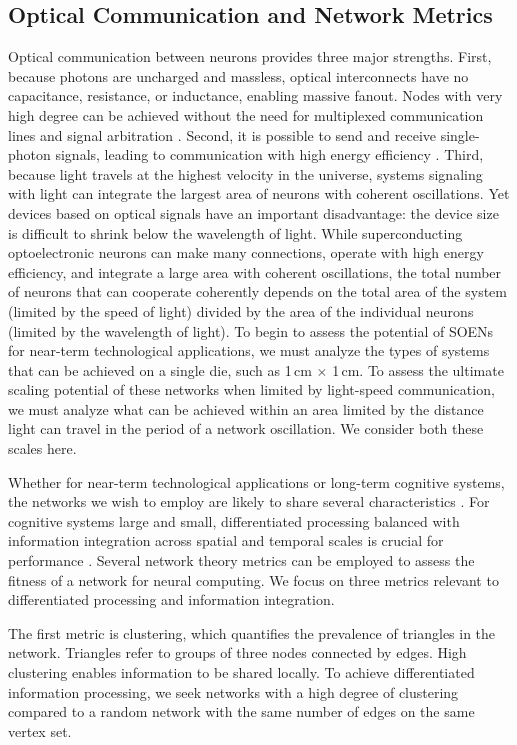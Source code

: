 \documentclass[aip,amsmath,amssymb,reprint,nofootinbib]{revtex4-1}
\begin{document}
\subsection{\label{sec:opticalCommunicationAndGraphMetrics}Optical Communication and Network Metrics}
Optical communication between neurons provides three major strengths. First, because photons are uncharged and massless, optical interconnects have no capacitance, resistance, or inductance, enabling massive fanout. Nodes with very high degree can be achieved without the need for multiplexed communication lines and signal arbitration \cite{lide2015}. Second, it is possible to send and receive single-photon signals, leading to communication with high energy efficiency \cite{mave2013}. Third, because light travels at the highest velocity in the universe, systems signaling with light can integrate the largest area of neurons with coherent oscillations. Yet devices based on optical signals have an important disadvantage: the device size is difficult to shrink below the wavelength of light. While superconducting optoelectronic neurons can make many connections, operate with high energy efficiency, and integrate a large area with coherent oscillations, the total number of neurons that can cooperate coherently depends on the total area of the system (limited by the speed of light) divided by the area of the individual neurons (limited by the wavelength of light). To begin to assess the potential of SOENs for near-term technological applications, we must analyze the types of systems that can be achieved on a single die, such as 1\,cm $\times$ 1\,cm. To assess the ultimate scaling potential of these networks when limited by light-speed communication, we must analyze what can be achieved within an area limited by the distance light can travel in the period of a network oscillation. We consider both these scales here.

Whether for near-term technological applications or long-term cognitive systems, the networks we wish to employ are likely to share several characteristics \cite{busp2009}. For cognitive systems large and small, differentiated processing balanced with information integration across spatial and temporal scales is crucial for performance \cite{tosp2003,to2004,to2008,bu2006,sp2010,base2011,haah2017}. Several network theory metrics can be employed to assess the fitness of a network for neural computing. We focus on three metrics relevant to differentiated processing and information integration. 

The first metric is clustering, which quantifies the prevalence of triangles in the network. Triangles refer to groups of three nodes connected by edges. High clustering enables information to be shared locally. To achieve differentiated information processing, we seek networks with a high degree of clustering compared to a random network with the same number of edges on the same vertex set. 
\end{document}
